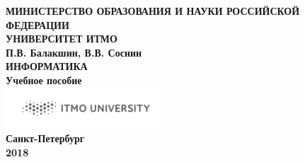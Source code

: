\documentclass[a5paper,14pt]{report}
\begin{document}
\pagestyle{empty}
\newpage
\mbox{}
\newpage
\begin{center}
\scriptsize
\textbf {
МИНИСТЕРСТВО ОБРАЗОВАНИЯ И НАУКИ РОССИЙСКОЙ ФЕДЕРАЦИИ
\newline
\\УНИВЕРСИТЕТ ИТМО
\large
\\\vspace{4cm}
П.В. Балакшин, В.В. Соснин
\\\vspace{1cm}
\LARGE
ИНФОРМАТИКА
\Large
\\\vspace{1cm}
Учебное пособие
\\\vspace{6cm}
\includegraphics[width=6cm]{ITMO_log}
\\\vspace{0.5cm}
\normalsize
Санкт-Петербург
\\2018
}
\end{center}
\end{document}
